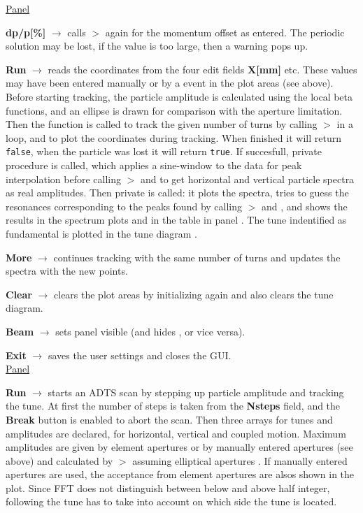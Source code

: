\documentclass[12pt]{article}
\newcommand\code[1]{{\tt #1}}
\newcommand{\ofld}[1]{\colorbox{black!15}{{{\color{black}\bf #1}}}}
\newcommand\guico[1]{{\color{blue}\code{#1}}}
\newcommand\guifco[1]{{\color{violet}\code{#1}}}
\newcommand{\unico}[1]{{\color{burntorange}\code{#1}}}
\newcommand{\evcod}[2]{\ofld{#1} $\rightarrow$ \guico{#2}}
\newcommand{\prcod}[2]{\opauni{#1}$>$\unico{#2}}
\newcommand{\opagui}[1]{\colorbox{blue!20}{{\color{black}\code{#1}}}}
\newcommand{\ogui}[1]{\hyperref[#1]{\opagui{#1}}}
\newcommand{\opaguif}[1]{\colorbox{violet!30}{{\color{black}\code{#1}}}}
\newcommand{\oguif}[1]{\hyperref[#1]{\opaguif{#1}}}
\newcommand{\opauni}[1]{\colorbox{orange!30}{{\color{black}\code{#1}}}}
\begin{document}
\underline{Panel \guico{PanCtrl}}

\evcod{dp/p[\%]}{ediAction[edidpp]} calls \prcod{tracklib}{Initdpp} again for the momentum offset as entered. The periodic solution may be lost, if the value is too large, then a warning pops up. 

\evcod{Run}{butRunClick} reads the coordinates from the four edit fields \ofld{X[mm]} etc. These values may have been entered manually or by a \guifco{pMouseDown} event in the \guico{psx,psy} plot areas (see \oguif{../com/asfigure} above). Before starting tracking, the particle amplitude is calculated using the local beta functions, and an ellipse is drawn for comparison with the aperture limitation. Then the function \guico{Track} is called to track the given number of turns by calling 
\prcod{tracklib}{Oneturn} in a loop, and to plot the coordinates during tracking. When finished it will return \code{false}, when the particle was lost it will return \code{true}. If succesfull, private procedure \guico{Spectrum} is called, which applies a sine-window to the data for peak interpolation before calling \prcod{tracklib}{TWOFFT} and \unico{FFTtoAmp} to get horizontal and vertical particle spectra as real amplitudes. Then private \guico{FFTplot} is called: it plots the spectra, tries to guess the resonances corresponding to the peaks found by calling \prcod{tracklib}{FindPeaks} and \unico{ResoGuess}, and shows the results in the spectrum plots and in the table \guico{resgrid} in panel \guico{PanRes}. The tune indentified as fundamental is plotted in the tune diagram \ogui{opatunediag}.

\evcod{More}{butMoreClick} continues tracking with the same number of turns and updates the spectra with the new points.

\evcod{Clear}{butClearClick} clears the plot areas by initializing again and also clears the tune diagram.

\evcod{Beam}{butBeamClick} sets panel \guico{PanBeam} visible (and hides \guico{PanTush}, or vice versa).

\evcod{Exit}{butExitClick} saves the user settings and closes the GUI.\\[1ex]

\underline{Panel \guico{PanTush}}

\evcod{Run}{butTushClick} starts an ADTS scan by stepping up particle amplitude and tracking the tune. At first the number of steps is taken from the \ofld{Nsteps} field, and the \ofld{Break} button is enabled to abort the scan. Then three arrays for tunes and amplitudes are declared, for horizontal, vertical and coupled motion. Maximum amplitudes are given by element apertures or by manually entered apertures (see above) and calculated by \prcod{tracklib}{AmpKappa} assuming elliptical apertures \cite{inside}.  If manually entered apertures are used, the acceptance from element apertures are alsos shown in the plot. Since FFT does not distinguish between below and above half integer, following the tune has to take into account on which side the tune is located.
\end{document}
